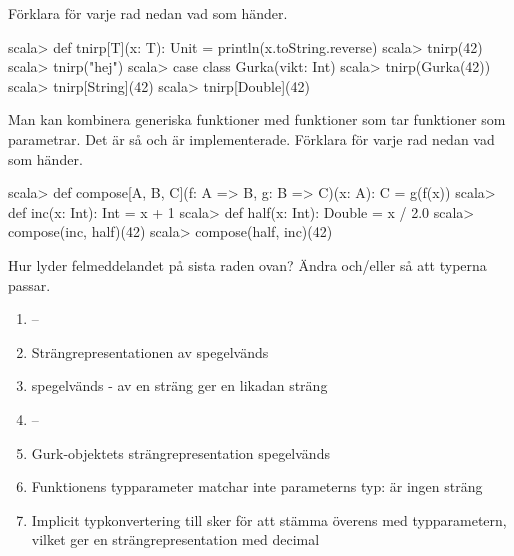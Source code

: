\Subtask Förklara för varje rad nedan vad som händer.

\begin{REPL}
scala> def tnirp[T](x: T): Unit = println(x.toString.reverse)
scala> tnirp(42)
scala> tnirp("hej")
scala> case class Gurka(vikt: Int)
scala> tnirp(Gurka(42))
scala> tnirp[String](42)
scala> tnirp[Double](42)
\end{REPL}

\Subtask Man kan kombinera generiska funktioner med funktioner som tar funktioner som parametrar. Det är så  och  är implementerade. Förklara för varje rad nedan vad som händer.

\begin{REPL}
scala> def compose[A, B, C](f: A => B, g: B => C)(x: A): C = g(f(x))
scala> def inc(x: Int): Int = x + 1
scala> def half(x: Int): Double = x / 2.0
scala> compose(inc, half)(42)
scala> compose(half, inc)(42)
\end{REPL}

\Subtask Hur lyder felmeddelandet på sista raden ovan? Ändra  och/eller  så att typerna passar.


\SOLUTION


\TaskSolved \what

\SubtaskSolved   \begin{enumerate}
\item --
\item Strängrepresentationen av  spegelvänds
\item {} spegelvänds -  av en sträng ger en likadan sträng
\item --
\item Gurk-objektets strängrepresentation spegelvänds
\item Funktionens typparameter matchar inte parameterns typ:  är ingen sträng
\item Implicit typkonvertering till  sker för att stämma överens med typparametern, vilket ger en strängrepresentation med decimal
\end{enumerate}


